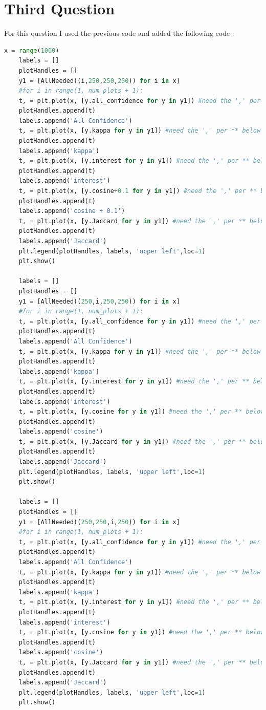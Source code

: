 \documentclass{article}
\begin{document}
	\section*{Third Question}
	For this question I used the previous code and added the following code :
	\begin{lstlisting}[language = Python]
	x = range(1000)
	labels = []
	plotHandles = []
	y1 = [AllNeeded((i,250,250,250)) for i in x]
	#for i in range(1, num_plots + 1):
	t, = plt.plot(x, [y.all_confidence for y in y1]) #need the ',' per ** below
	plotHandles.append(t)
	labels.append('All Confidence')
	t, = plt.plot(x, [y.kappa for y in y1]) #need the ',' per ** below
	plotHandles.append(t)
	labels.append('kappa')
	t, = plt.plot(x, [y.interest for y in y1]) #need the ',' per ** below
	plotHandles.append(t)
	labels.append('interest')
	t, = plt.plot(x, [y.cosine+0.1 for y in y1]) #need the ',' per ** below
	plotHandles.append(t)
	labels.append('cosine + 0.1')
	t, = plt.plot(x, [y.Jaccard for y in y1]) #need the ',' per ** below
	plotHandles.append(t)
	labels.append('Jaccard')
	plt.legend(plotHandles, labels, 'upper left',loc=1)
	plt.show()
	
	labels = []
	plotHandles = []
	y1 = [AllNeeded((250,i,250,250)) for i in x]
	#for i in range(1, num_plots + 1):
	t, = plt.plot(x, [y.all_confidence for y in y1]) #need the ',' per ** below
	plotHandles.append(t)
	labels.append('All Confidence')
	t, = plt.plot(x, [y.kappa for y in y1]) #need the ',' per ** below
	plotHandles.append(t)
	labels.append('kappa')
	t, = plt.plot(x, [y.interest for y in y1]) #need the ',' per ** below
	plotHandles.append(t)
	labels.append('interest')
	t, = plt.plot(x, [y.cosine for y in y1]) #need the ',' per ** below
	plotHandles.append(t)
	labels.append('cosine')
	t, = plt.plot(x, [y.Jaccard for y in y1]) #need the ',' per ** below
	plotHandles.append(t)
	labels.append('Jaccard')
	plt.legend(plotHandles, labels, 'upper left',loc=1)
	plt.show()
	
	labels = []
	plotHandles = []
	y1 = [AllNeeded((250,250,i,250)) for i in x]
	#for i in range(1, num_plots + 1):
	t, = plt.plot(x, [y.all_confidence for y in y1]) #need the ',' per ** below
	plotHandles.append(t)
	labels.append('All Confidence')
	t, = plt.plot(x, [y.kappa for y in y1]) #need the ',' per ** below
	plotHandles.append(t)
	labels.append('kappa')
	t, = plt.plot(x, [y.interest for y in y1]) #need the ',' per ** below
	plotHandles.append(t)
	labels.append('interest')
	t, = plt.plot(x, [y.cosine for y in y1]) #need the ',' per ** below
	plotHandles.append(t)
	labels.append('cosine')
	t, = plt.plot(x, [y.Jaccard for y in y1]) #need the ',' per ** below
	plotHandles.append(t)
	labels.append('Jaccard')
	plt.legend(plotHandles, labels, 'upper left',loc=1)
	plt.show()
	

\end{lstlisting}
\end{document}
